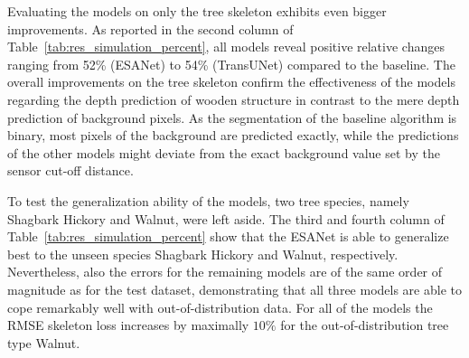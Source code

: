 Evaluating the models on only the tree skeleton exhibits even bigger improvements. As reported in the second column of Table~\ref{tab:res_simulation_percent}, all models reveal positive relative changes ranging from 52\% (ESANet) to 54\% (TransUNet) compared to the baseline. The overall improvements on the tree skeleton confirm the effectiveness of the models regarding the depth prediction of wooden structure in contrast to the mere depth prediction of background pixels. As the segmentation of the baseline algorithm is binary, most pixels of the background are predicted exactly, while the predictions of the other models might deviate from the exact background value set by the sensor cut-off distance.

To test the generalization ability of the models, two tree species, namely Shagbark Hickory and Walnut, were left aside. The third and fourth column of Table~\ref{tab:res_simulation_percent} show that the ESANet is able to generalize best to the unseen species Shagbark Hickory and Walnut, respectively. Nevertheless, also the errors for the remaining models are of the same order of magnitude as for the test dataset, demonstrating that all three models are able to cope remarkably well with out-of-distribution data. For all of the models the RMSE skeleton loss increases by maximally $10\%$ for the out-of-distribution tree type Walnut. %

